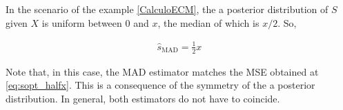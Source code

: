 {\begin{example}

In the scenario of the example \ref{CalculoECM}, the a posterior distribution of $S$ given $X$ is uniform between 0 and $x$, the median of which is $x/2$. So,

\begin{align}
\label{ec:estimador_MSE_finalej}
\hat s_{\text{MAD}} = \frac{1}{2} x 
\end{align}

Note that, in this case, the MAD estimator matches the MSE obtained at \eqref{eq:sopt_halfx}. This is a consequence of the symmetry of the a posterior distribution. In general, both estimators do not have to coincide.

\end{example}\vspace{0.4cm}
}



